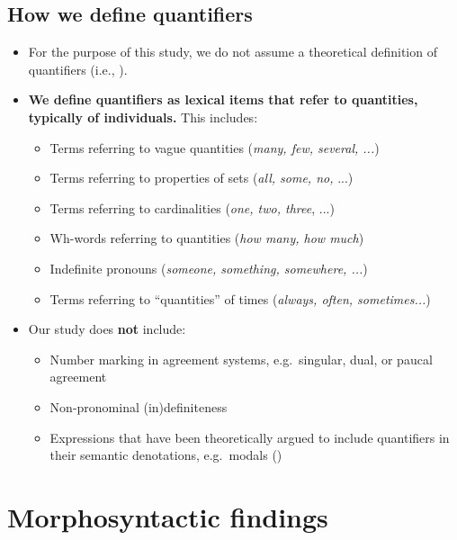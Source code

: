 \documentclass{article}
\begin{document}
    \subsection{How we define quantifiers}
\begin{itemize}
    \item For the purpose of this study, we do not assume a theoretical definition of quantifiers (i.e., \citealt{heimkratzer98}).
    \item {\bf We define quantifiers as lexical items that refer to quantities, typically of individuals.}  This includes:
    
    
\begin{itemize}
        \item Terms referring to vague quantities ({\it many, few, several, ...})
        \item Terms referring to properties of sets ({\it all, some, no,} ...)
        \item Terms referring to cardinalities ({\it one, two, three}, ...)
        \item Wh-words referring to quantities  ({\it how many, how much})
        \item Indefinite pronouns ({\it someone, something, somewhere, ...})
        \item Terms referring to ``quantities'' of times ({\it always, often, sometimes...})
\end{itemize}
    \item Our study does {\bf not} include:
\begin{itemize}
    \item Number marking in agreement systems, e.g.\ singular, dual, or paucal agreement
    \item Non-pronominal (in)definiteness
    \item Expressions that have been theoretically argued to include quantifiers in their semantic denotations, e.g.\ modals (\citealt{heimkratzer98})
\end{itemize}
\end{itemize}


\section{Morphosyntactic findings}
\label{sec:mpsfind}
\end{document}
